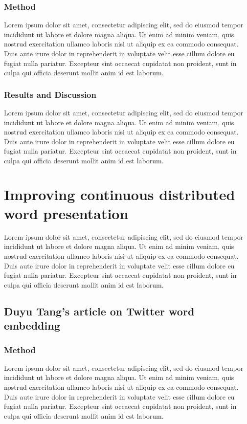 \subsubsection{Method}
Lorem ipsum dolor sit amet, consectetur adipiscing elit, sed do eiusmod tempor incididunt ut labore et dolore magna aliqua. Ut enim ad minim veniam, quis nostrud exercitation ullamco laboris nisi ut aliquip ex ea commodo consequat. Duis aute irure dolor in reprehenderit in voluptate velit esse cillum dolore eu fugiat nulla pariatur. Excepteur sint occaecat cupidatat non proident, sunt in culpa qui officia deserunt mollit anim id est laborum.
\subsubsection{Results and Discussion}
Lorem ipsum dolor sit amet, consectetur adipiscing elit, sed do eiusmod tempor incididunt ut labore et dolore magna aliqua. Ut enim ad minim veniam, quis nostrud exercitation ullamco laboris nisi ut aliquip ex ea commodo consequat. Duis aute irure dolor in reprehenderit in voluptate velit esse cillum dolore eu fugiat nulla pariatur. Excepteur sint occaecat cupidatat non proident, sunt in culpa qui officia deserunt mollit anim id est laborum.

\section{Improving continuous distributed word presentation}
Lorem ipsum dolor sit amet, consectetur adipiscing elit, sed do eiusmod tempor incididunt ut labore et dolore magna aliqua. Ut enim ad minim veniam, quis nostrud exercitation ullamco laboris nisi ut aliquip ex ea commodo consequat. Duis aute irure dolor in reprehenderit in voluptate velit esse cillum dolore eu fugiat nulla pariatur. Excepteur sint occaecat cupidatat non proident, sunt in culpa qui officia deserunt mollit anim id est laborum.
\subsection{Duyu Tang's article on Twitter word embedding}
\subsubsection{Method}
Lorem ipsum dolor sit amet, consectetur adipiscing elit, sed do eiusmod tempor incididunt ut labore et dolore magna aliqua. Ut enim ad minim veniam, quis nostrud exercitation ullamco laboris nisi ut aliquip ex ea commodo consequat. Duis aute irure dolor in reprehenderit in voluptate velit esse cillum dolore eu fugiat nulla pariatur. Excepteur sint occaecat cupidatat non proident, sunt in culpa qui officia deserunt mollit anim id est laborum.
